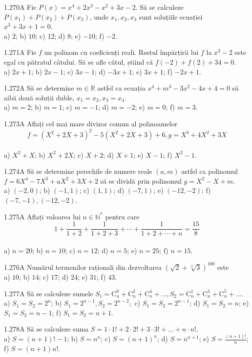 \documentclass[11pt]{article}
\begin{document}
1.270A Fie $P(x)=x^{4}+2 x^{3}-x^{2}+3 x-2$. Să se calculeze $P\left(x_{1}\right)+P\left(x_{2}\right)+P\left(x_{3}\right)$, unde $x_{1}, x_{2}, x_{3}$ sunt soluțiile ecuației $x^{3}+3 x+1=0$.\\ a) $2$; b) $10$; c) $12$; d) $8$; e) $-10$; f) $-2$.

1.271A Fie $f$ un polinom cu coeficienți reali. Restul împărțirii lui $f$ la $x^{3}-2$ este egal cu pătratul câtului. Să se afle câtul, știind că $f(-2)+f(2)+34=0$.\\ a) $2 x+1$; b) $2 x-1$; c) $3 x-1$; d) $-3 x+1$; e) $3 x+1$; f) $-2 x+1$.

1.272A Să se determine $m \in \mathbb{R}$ astfel ca ecuația $x^{4}+m^{3}-3 x^{2}-4 x+4=0$ să aibă două soluții duble, $x_{1}=x_{2}, x_{3}=x_{4}$.\\ a) $m=2$; b) $m=1$; c) $m=-1$; d) $m=-2$; e) $m=0$; f) $m=3$.

1.273A Aflați cel mai mare divizor comun al polinoamelor $$f=\left(X^{2}+2X+3\right)^{2}-5\left(X^{2}+2 X+3\right)+6, g=X^{3}+4 X^{2}+3 X$$\\ a) $X^{2}+X$; b) $X^{2}+2 X$; c) $X+2$; d) $X+1$; e) $X-1$; f) $X^{2}-1$.

1.274A Să se determine perechile de numere reale $(a, m)$ astfel ca polinomul $f=6 X^{4}-7 X^{3}+a X^{2}+3 X+2$ să se dividă prin polinomul $g=X^{2}-X+m$.\\ a) $(-2,0)$; b) $(-1,1)$; c) $(1,1)$; d) $(-7,1)$; e) $(-12,-2)$; f) $(-7,-1),(-12,-2)$.

1.275A Aflați valoarea lui $n \in \mathbb{N}^{*}$ pentru care $$1+\frac{1}{1+2}+\frac{1}{1+2+3}+\cdots+\frac{1}{1+2+\cdots+n}=\frac{15}{8}$$\\ a) $n=20$; b) $n=10$; c) $n=12$; d) $n=5$; e) $n=25$; f) $n=15$.

1.276A Numărul termenilor raționali din dezvoltarea $(\sqrt{2}+\sqrt[3]{3})^{100}$ este\\ a) $10$; b) $14$; c) $17$; d) $24$; e) $31$; f) $43$.

1.277A Să se calculeze sumele $S_{1}=\mathrm{C}_{n}^{0}+\mathrm{C}_{n}^{2}+\mathrm{C}_{n}^{4}+\ldots, S_{2}=\mathrm{C}_{n}^{1}+\mathrm{C}_{n}^{3}+\mathrm{C}_{n}^{5}+\ldots$.\\ a) $S_{1}=S_{2}=2^{n}$; b) $S_{1}=2^{n-1}, S_{2}=2^{n-2} ;$ c) $S_{1}=S_{2}=2^{n-1}$; d) $S_{1}=S_{2}=n$; e) $S_{1}=S_{2}=n-1$; f) $S_{1}=S_{2}=n+1$.

1.278A Să se calculeze suma $S=1 \cdot 1!+2 \cdot 2!+3 \cdot 3!+\ldots+n \cdot n!$.\\ a) $S=(n+1)!-1$; b) $S=n^{n}$; c) $S=(n+1)^{n}$; d) $S=n^{n+1}$; e) $S=\frac{(n+1)!}{n}$; f) $S=(n+1) n!$.
\end{document}
